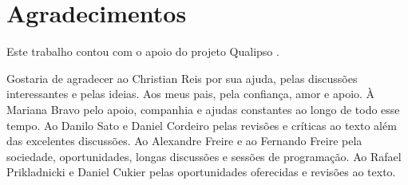 \documentclass[11pt,twoside,a4paper]{book}
\begin{document}
%
%
%
%
%	
%	  


\chapter*{Agradecimentos}

Este trabalho contou com o apoio do projeto Qualipso \cite{Qualipso}.

Gostaria de agradecer ao Christian Reis por sua ajuda, pelas
discussões interessantes e pelas ideias. Aos meus pais, pela
confiança, amor e apoio. À Mariana Bravo pelo apoio, companhia e
ajudas constantes ao longo de todo esse tempo. Ao Danilo Sato e Daniel
Cordeiro pelas revisões e críticas ao texto além das excelentes
discussões. Ao Alexandre Freire e ao Fernando Freire pela sociedade,
oportunidades, longas discussões e sessões de programação. Ao Rafael
Prikladnicki e Daniel Cukier pelas oportunidades oferecidas e revisões
ao texto.
\end{document}
